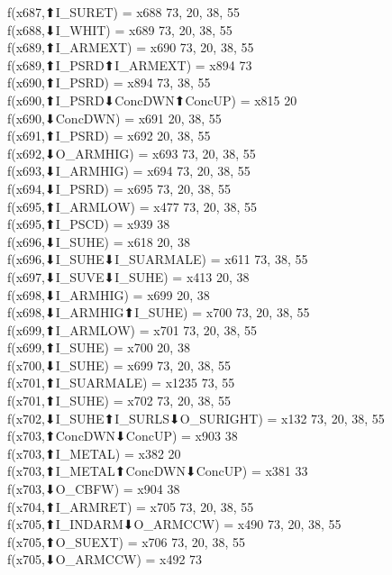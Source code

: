f(x687,⬆I_SURET) = x688 {73, 20, 38, 55} \\
f(x688,⬇I_WHIT) = x689 {73, 20, 38, 55} \\
f(x689,⬆I_ARMEXT) = x690 {73, 20, 38, 55} \\
f(x689,⬆I_PSRD⬆I_ARMEXT) = x894 {73} \\
f(x690,⬆I_PSRD) = x894 {73, 38, 55} \\
f(x690,⬆I_PSRD⬇ConcDWN⬆ConcUP) = x815 {20} \\
f(x690,⬇ConcDWN) = x691 {20, 38, 55} \\
f(x691,⬆I_PSRD) = x692 {20, 38, 55} \\
f(x692,⬇O_ARMHIG) = x693 {73, 20, 38, 55} \\
f(x693,⬇I_ARMHIG) = x694 {73, 20, 38, 55} \\
f(x694,⬇I_PSRD) = x695 {73, 20, 38, 55} \\
f(x695,⬆I_ARMLOW) = x477 {73, 20, 38, 55} \\
f(x695,⬆I_PSCD) = x939 {38} \\
f(x696,⬇I_SUHE) = x618 {20, 38} \\
f(x696,⬇I_SUHE⬇I_SUARMALE) = x611 {73, 38, 55} \\
f(x697,⬇I_SUVE⬇I_SUHE) = x413 {20, 38} \\
f(x698,⬇I_ARMHIG) = x699 {20, 38} \\
f(x698,⬇I_ARMHIG⬆I_SUHE) = x700 {73, 20, 38, 55} \\
f(x699,⬆I_ARMLOW) = x701 {73, 20, 38, 55} \\
f(x699,⬆I_SUHE) = x700 {20, 38} \\
f(x700,⬇I_SUHE) = x699 {73, 20, 38, 55} \\
f(x701,⬆I_SUARMALE) = x1235 {73, 55} \\
f(x701,⬆I_SUHE) = x702 {73, 20, 38, 55} \\
f(x702,⬇I_SUHE⬆I_SURLS⬇O_SURIGHT) = x132 {73, 20, 38, 55} \\
f(x703,⬆ConcDWN⬇ConcUP) = x903 {38} \\
f(x703,⬆I_METAL) = x382 {20} \\
f(x703,⬆I_METAL⬆ConcDWN⬇ConcUP) = x381 {33} \\
f(x703,⬇O_CBFW) = x904 {38} \\
f(x704,⬆I_ARMRET) = x705 {73, 20, 38, 55} \\
f(x705,⬆I_INDARM⬇O_ARMCCW) = x490 {73, 20, 38, 55} \\
f(x705,⬆O_SUEXT) = x706 {73, 20, 38, 55} \\
f(x705,⬇O_ARMCCW) = x492 {73} \\
